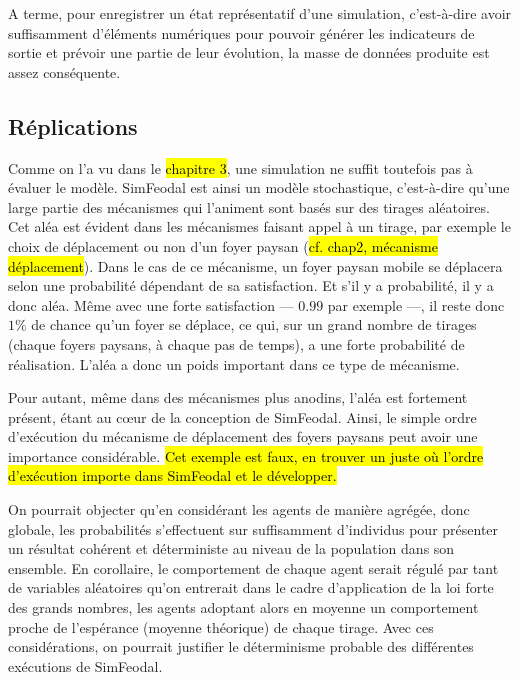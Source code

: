 	A terme, pour enregistrer un état représentatif d'une simulation, c'est-à-dire avoir suffisamment d'éléments numériques pour pouvoir générer les indicateurs de sortie et prévoir une partie de leur évolution, la masse de données produite est assez conséquente. 

	\subsection{Réplications}

	Comme on l'a vu dans le \hl{chapitre 3}, une simulation ne suffit toutefois pas à évaluer le modèle.
	SimFeodal est ainsi un modèle stochastique, c'est-à-dire qu'une large partie des mécanismes qui l'animent sont basés sur des tirages aléatoires.
	Cet aléa est évident dans les mécanismes faisant appel à un tirage, par exemple le choix de déplacement ou non d'un foyer paysan (\hl{cf. chap2, mécanisme déplacement}).
	Dans le cas de ce mécanisme, un foyer paysan mobile se déplacera selon une probabilité dépendant de sa satisfaction.
	Et s'il y a probabilité, il y a donc aléa.
	Même avec une forte satisfaction --- $0.99$ par exemple ---, il reste donc $1\%$ de chance qu'un foyer se déplace, ce qui, sur un grand nombre de tirages (chaque foyers paysans, à chaque pas de temps), a une forte probabilité de réalisation.
	L'aléa a donc un poids important dans ce type de mécanisme.

	Pour autant, même dans des mécanismes plus anodins, l'aléa est fortement présent, étant au cœur de la conception de SimFeodal.
	Ainsi, le simple ordre d’exécution du mécanisme de déplacement des foyers paysans peut avoir une importance considérable.
	\hl{Cet exemple est faux, en trouver un juste où l'ordre d’exécution importe dans SimFeodal et le développer.}

	On pourrait objecter qu'en considérant les agents de manière agrégée, donc globale, les probabilités s'effectuent sur suffisamment d'individus pour présenter un résultat cohérent et déterministe au niveau de la population dans son ensemble.
	En corollaire, le comportement de chaque agent serait régulé par tant de variables aléatoires qu'on entrerait dans le cadre d'application de la loi forte des grands nombres, les agents adoptant alors en moyenne un comportement proche de l’espérance (moyenne théorique) de chaque tirage.
	Avec ces considérations, on pourrait justifier le déterminisme probable des différentes exécutions de SimFeodal.

